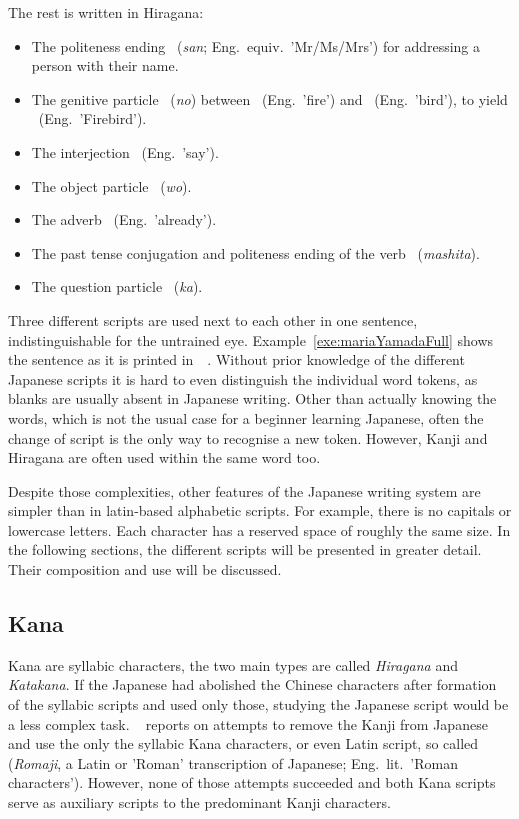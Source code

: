 The rest is written in Hiragana:
\begin{itemize}
  \item The politeness ending ~(\emph{san}; 
        Eng.~equiv.~'Mr/Ms/Mrs') for addressing a person with their name.
  \item The genitive particle ~(\emph{no}) between 
        ~(Eng.~'fire') and ~(Eng.~'bird'), to yield 
        ~(Eng.~'Firebird').
  \item The interjection ~(Eng.~'say').
  \item The object particle ~(\emph{wo}).
  \item The adverb ~(Eng.~'already').
  \item The past tense conjugation and politeness ending of the 
        verb ~(\emph{mashita}).
  \item The question particle ~(\emph{ka}).
\end{itemize}

Three different scripts are used next to each other in one sentence,
indistinguishable for the untrained eye. Example~\ref{exe:mariaYamadaFull} 
shows the sentence as it is printed 
in~~\citeyear{Katsuki2006Book}. Without prior
knowledge of the different Japanese scripts it is hard to even distinguish
the individual word tokens, as blanks are usually absent in Japanese writing.
Other than actually knowing the words, which is not the usual case for a 
beginner learning Japanese, often the change of script is the only way to 
recognise a new token. However, Kanji and Hiragana are often used within the same
word too.

Despite those complexities, other features of the Japanese writing system are 
simpler than in latin-based alphabetic scripts. 
For example, there is no capitals or lowercase letters.
Each character has a reserved space of roughly the same size.
In the following sections, the different scripts will be presented in greater 
detail. Their composition and use will be discussed.

\subsection{Kana }
\label{sec:kana}

Kana are syllabic characters, the two main types are called \emph{Hiragana}
and \emph{Katakana}.
If the Japanese had abolished the Chinese characters after formation of the
syllabic scripts and used only those, studying the Japanese script would be
a less complex task.
~\citeyear{Lange1922} reports 
on attempts to remove the Kanji from Japanese and use the 
only the syllabic Kana characters, or even Latin script, 
so called  (\emph{Romaji}, a Latin or 'Roman' 
transcription of Japanese; Eng.~lit.~'Roman characters'). 
However, none of those attempts succeeded and both Kana scripts serve as 
auxiliary scripts to the predominant Kanji characters. 

